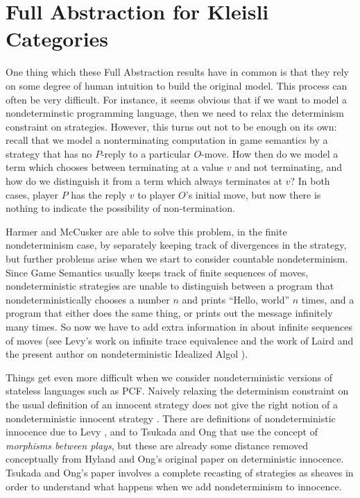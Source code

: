\documentclass[11pt]{report}
\begin{document}
\section{Full Abstraction for Kleisli Categories}

One thing which these Full Abstraction results have in common is that they rely on some degree of human intuition to build the original model.  
This process can often be very difficult.  
For instance, it seems obvious that if we want to model a nondeterminstic programming language, then we need to relax the determinism constraint on strategies.  
However, this turns out not to be enough on its own: recall that we model a nonterminating computation in game semantics by a strategy that has no $P$-reply to a particular $O$-move.  
How then do we model a term which chooses between terminating at a value $v$ and not terminating, and how do we distinguish it from a term which always terminates at $v$?  
In both cases, player $P$ has the reply $v$ to player $O$'s initial move, but now there is nothing to indicate the possibility of non-termination.  

Harmer and McCusker are able to solve this problem, in the finite nondeterminism case, by separately keeping track of divergences in the strategy, but further problems arise when we start to consider countable nondeterminism.  
Since Game Semantics usually keeps track of finite sequences of moves, nondeterministic strategies are unable to distinguish between a program that nondeterministically chooses a number $n$ and prints ``Hello, world'' $n$ times, and a program that either does the same thing, or prints out the message infinitely many times.
So now we have to add extra information in about infinite sequences of moves (see Levy's work on infinite trace equivalence \cite{LevyGsInfinite} and the work of Laird and the present author on nondeterministic Idealized Algol \cite{CslPaper}).

Things get even more difficult when we consider nondeterministic versions of stateless languages such as PCF.  
Naively relaxing the determinism constraint on the usual definition of an innocent strategy does not give the right notion of a nondeterministic innocent strategy \cite{TsukadaSheaves}.  
There are definitions of nondeterministic innocence due to Levy \cite{levy2014morphisms}, and to Tsukada and Ong \cite{TsukadaSheaves} that use the concept of \emph{morphisms between plays}, but these are already some distance removed conceptually from Hyland and Ong's original paper on deterministic innocence.
Tsukada and Ong's paper involves a complete recasting of strategies as sheaves in order to understand what happens when we add nondeterminism to innocence.
\end{document}

